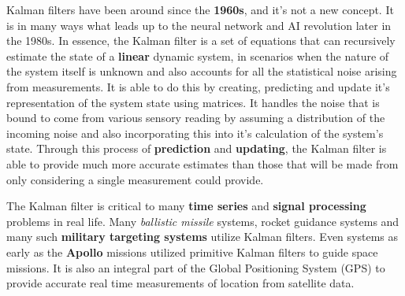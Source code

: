 \documentclass{article}
\begin{document}
Kalman filters have been around since the \textbf{1960s}, and it's not a new concept. It is in many ways what leads up to the neural network and AI revolution later in the 1980s. In essence, the Kalman filter is a set of equations that can recursively estimate the state of a \textbf{linear} dynamic system, in scenarios when the nature of the system itself is unknown and also accounts for all the statistical noise arising from measurements. It is able to do this by creating, predicting and update it's representation of the system state using matrices. It handles the noise that is bound to come from various sensory reading by assuming a distribution of the incoming noise and also incorporating this into it's calculation of the system's state. Through this process of \textbf{prediction} and \textbf{updating}, the Kalman filter is able to provide much more accurate estimates than those that will be made from only considering a single measurement could provide. 

The Kalman filter is critical to many \textbf{time series} and \textbf{signal processing} problems in real life. Many \textit{ballistic missile} systems, rocket guidance systems and many such \textbf{military targeting systems} utilize Kalman filters. Even systems as early as the \textbf{Apollo} missions utilized primitive Kalman filters to guide space missions. It is also an integral part of the Global Positioning System (GPS) to provide accurate real time measurements of location from satellite data.
\end{document}
